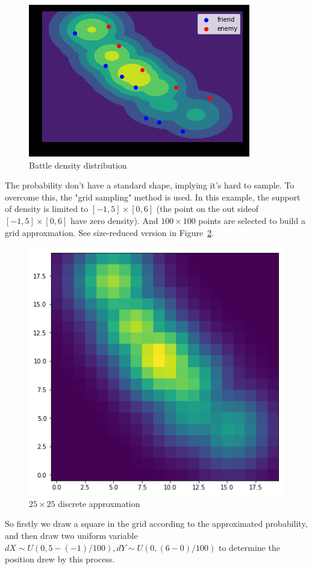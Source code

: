 \documentclass{article}
\begin{document}
\begin{figure}[h]
\includegraphics{state_no_battle_prob.png}
\caption{Battle density distribution}
\label{fig:stateNoBattleProb}
\end{figure}

The probability don't have a standard shape, implying it's hard to sample. To overcome this, the "grid 
sampling" method is used. In this example, the support of density is limited to $[-1,5] \times [0,6]$
(the point on the out sideof $[-1,5] \times [0,6]$ have zero density). And $100 \times 100$ points are 
selected to build a grid approxmation. See size-reduced version in Figure~\ref{fig:gridify}.

\begin{figure}[h]
\includegraphics[width=0.6\linewidth]{gridify.png}
\caption{$25 \times 25$ discrete approxmation}
\label{fig:gridify}
\end{figure}

So firstly we draw a square in the grid according to the approximated probability, 
and then draw two uniform variable $dX \sim U(0,5-(-1)/100),dY \sim U(0,(6-0)/100)$ 
to determine the position drew by this process.
\end{document}
